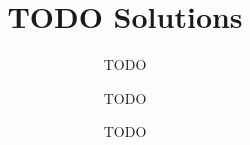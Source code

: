\documentclass[11pt]{scrartcl}
\begin{document}
\title{TODO Solutions}
\subtitle{TODO}
\author{TODO}
\date{TODO}
\maketitle

\tableofcontents

\cleardoublepage




\end{document}
